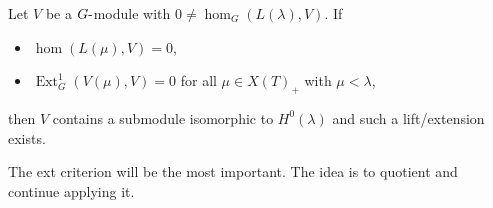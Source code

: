 \begin{lemma}[Important!]

\begin{lemma}[Important!]

Let \(V\) be a \(G{\hbox{-}}\)module with
\(0\neq \hom_G(L(\lambda), V)\). If

\begin{itemize}
\item
  \(\hom(L(\mu), V) = 0\),
\item
  \(\operatorname{Ext}_G^1(V(\mu), V) = 0\) for all \(\mu \in X(T)_+\)
  with \(\mu < \lambda\),
\end{itemize}

then \(V\) contains a submodule isomorphic to \(H^0(\lambda)\) and such
a lift/extension exists.

\end{lemma}

\end{lemma}

\begin{remark}

\begin{remark}

The ext criterion will be the most important. The idea is to quotient
and continue applying it.

\end{remark}

\end{remark}


